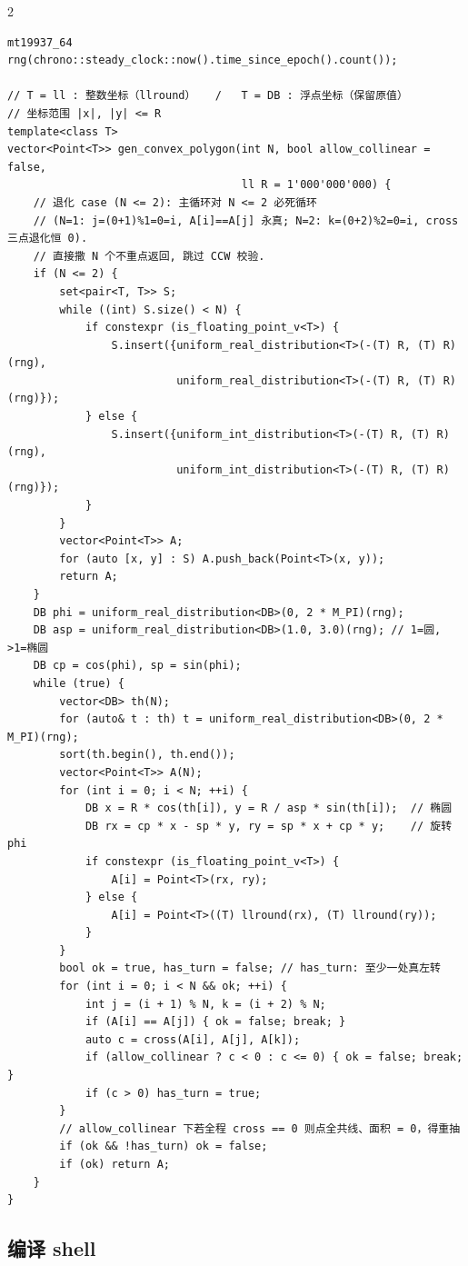 \begin{multicols*}{2}
		\begin{verbatim}
mt19937_64 rng(chrono::steady_clock::now().time_since_epoch().count());

// T = ll : 整数坐标（llround）   /   T = DB : 浮点坐标（保留原值）
// 坐标范围 |x|, |y| <= R
template<class T>
vector<Point<T>> gen_convex_polygon(int N, bool allow_collinear = false,
                                    ll R = 1'000'000'000) {
    // 退化 case (N <= 2): 主循环对 N <= 2 必死循环
    // (N=1: j=(0+1)%1=0=i, A[i]==A[j] 永真; N=2: k=(0+2)%2=0=i, cross 三点退化恒 0).
    // 直接撒 N 个不重点返回, 跳过 CCW 校验.
    if (N <= 2) {
        set<pair<T, T>> S;
        while ((int) S.size() < N) {
            if constexpr (is_floating_point_v<T>) {
                S.insert({uniform_real_distribution<T>(-(T) R, (T) R)(rng),
                          uniform_real_distribution<T>(-(T) R, (T) R)(rng)});
            } else {
                S.insert({uniform_int_distribution<T>(-(T) R, (T) R)(rng),
                          uniform_int_distribution<T>(-(T) R, (T) R)(rng)});
            }
        }
        vector<Point<T>> A;
        for (auto [x, y] : S) A.push_back(Point<T>(x, y));
        return A;
    }
    DB phi = uniform_real_distribution<DB>(0, 2 * M_PI)(rng);
    DB asp = uniform_real_distribution<DB>(1.0, 3.0)(rng); // 1=圆, >1=椭圆
    DB cp = cos(phi), sp = sin(phi);
    while (true) {
        vector<DB> th(N);
        for (auto& t : th) t = uniform_real_distribution<DB>(0, 2 * M_PI)(rng);
        sort(th.begin(), th.end());
        vector<Point<T>> A(N);
        for (int i = 0; i < N; ++i) {
            DB x = R * cos(th[i]), y = R / asp * sin(th[i]);  // 椭圆
            DB rx = cp * x - sp * y, ry = sp * x + cp * y;    // 旋转 phi
            if constexpr (is_floating_point_v<T>) {
                A[i] = Point<T>(rx, ry);
            } else {
                A[i] = Point<T>((T) llround(rx), (T) llround(ry));
            }
        }
        bool ok = true, has_turn = false; // has_turn: 至少一处真左转
        for (int i = 0; i < N && ok; ++i) {
            int j = (i + 1) % N, k = (i + 2) % N;
            if (A[i] == A[j]) { ok = false; break; }
            auto c = cross(A[i], A[j], A[k]);
            if (allow_collinear ? c < 0 : c <= 0) { ok = false; break; }
            if (c > 0) has_turn = true;
        }
        // allow_collinear 下若全程 cross == 0 则点全共线、面积 = 0，得重抽
        if (ok && !has_turn) ok = false;
        if (ok) return A;
    }
}
		\end{verbatim}

		\subsection{编译 shell}


\end{multicols*}
